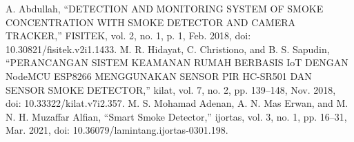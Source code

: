 \documentclass{article}
\begin{document}
    \begin{thebibliography}{3}
        \bibitem[1]A. Abdullah, “DETECTION AND MONITORING SYSTEM OF SMOKE CONCENTRATION WITH SMOKE DETECTOR AND CAMERA TRACKER,” FISITEK, vol. 2, no. 1, p. 1, Feb. 2018, doi: 10.30821/fisitek.v2i1.1433.
        \bibitem[2]M. R. Hidayat, C. Christiono, and B. S. Sapudin, “PERANCANGAN SISTEM KEAMANAN RUMAH BERBASIS IoT DENGAN NodeMCU ESP8266 MENGGUNAKAN SENSOR PIR HC-SR501 DAN SENSOR SMOKE DETECTOR,” kilat, vol. 7, no. 2, pp. 139–148, Nov. 2018, doi: 10.33322/kilat.v7i2.357.
        \bibitem[3]M. S. Mohamad Adenan, A. N. Mas Erwan, and M. N. H. Muzaffar Alfian, “Smart Smoke Detector,” ijortas, vol. 3, no. 1, pp. 16–31, Mar. 2021, doi: 10.36079/lamintang.ijortas-0301.198.
        
    \end{thebibliography}
\end{document}
